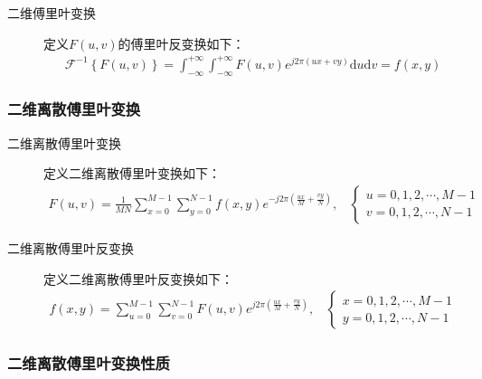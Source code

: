 \documentclass{hitreport}
\begin{document}
\begin{description}
\item[二维傅里叶变换] 
定义$F\left(u,v\right)$的傅里叶反变换如下：
\begin{align}
\mathscr{F}^{-1} \left\{F\left(u,v\right)\right\} = \int_{-\infty}^{+\infty}\int_{-\infty}^{+\infty}{F\left(u,v\right)e^{j2\pi \left(ux+vy\right)} \mathrm{d}u\mathrm{d}v} = f\left(x,y\right)
\end{align}
\end{description}

\subsubsection{二维离散傅里叶变换}

\begin{description}
\item[二维离散傅里叶变换] 

定义二维离散傅里叶变换如下：
\begin{align}
F\left(u,v\right) = \frac{1}{MN}\sum_{x=0}^{M-1}\sum_{y=0}^{N-1}{f\left(x,y\right)e^{-j2\pi \left(\frac{ux}{M}+\frac{vy}{N}\right)}},\ \ \ \ 
\left\{ \begin{array}{l}
u=0,1,2,\cdots,M-1\\
v = 0,1,2,\cdots,N-1	
\end{array}\right.
\end{align}
\end{description}
\begin{description}
\item[二维离散傅里叶反变换] 

定义二维离散傅里叶反变换如下：
\begin{align}
f\left(x,y\right) = \sum_{u=0}^{M-1}\sum_{v=0}^{N-1}{F\left(u,v\right)e^{j2\pi \left(\frac{ux}{M}+\frac{vy}{N}\right)}},\ \ \ \ 
\left\{ 
\begin{array}{l}
x=0,1,2,\cdots,M-1\\
y = 0,1,2,\cdots,N-1	
\end{array}
\right.
\end{align}
\end{description}

\subsubsection{二维离散傅里叶变换性质}
\end{document}
